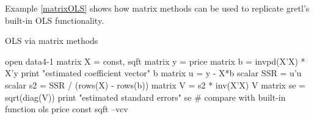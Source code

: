Example \ref{matrixOLS} shows how matrix methods can be used to
replicate gretl's built-in OLS functionality.

\begin{script}[htbp]
  \caption{OLS via matrix methods}
  \label{matrixOLS}
\begin{scode}
open data4-1
matrix X = { const, sqft }
matrix y = { price }
matrix b = invpd(X'X) * X'y
print "estimated coefficient vector"
b
matrix u = y - X*b
scalar SSR = u'u
scalar s2 = SSR / (rows(X) - rows(b))
matrix V = s2 * inv(X'X)
V
matrix se = sqrt(diag(V))
print "estimated standard errors"
se
# compare with built-in function
ols price const sqft --vcv
\end{scode}
\end{script}

